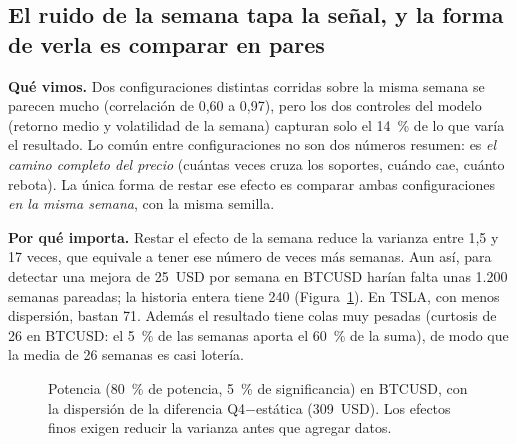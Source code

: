 \documentclass[11pt,a4paper]{article}
\begin{document}
\subsection{El ruido de la semana tapa la señal, y la forma de verla es comparar en pares}
\textbf{Qué vimos.} Dos configuraciones distintas corridas sobre la misma semana se parecen mucho (correlación
de 0,60 a 0,97), pero los dos controles del modelo (retorno medio y volatilidad de la semana) capturan solo
el 14~\% de lo que varía el resultado. Lo común entre configuraciones no son dos números resumen: es \emph{el camino
completo del precio} (cuántas veces cruza los soportes, cuándo cae, cuánto rebota). La única forma de restar
ese efecto es comparar ambas configuraciones \emph{en la misma semana}, con la misma semilla.

\textbf{Por qué importa.} Restar el efecto de la semana reduce la varianza entre 1,5 y 17 veces, que equivale a
tener ese número de veces más semanas. Aun así, para detectar una mejora de 25~USD por semana en BTCUSD harían
falta unas 1.200 semanas pareadas; la historia entera tiene 240 (Figura~\ref{fig:potencia}). En TSLA, con menos
dispersión, bastan 71. Además el resultado tiene colas muy pesadas (curtosis de 26 en BTCUSD: el 5~\% de las
semanas aporta el 60~\% de la suma), de modo que la media de 26 semanas es casi lotería.

\begin{figure}[H]
\centering
{}
\caption{Potencia (80~\% de potencia, 5~\% de significancia) en BTCUSD, con la dispersión de la diferencia
Q4$-$estática (309~USD). Los efectos finos exigen reducir la varianza antes que agregar datos.}
\label{fig:potencia}
\end{figure}
\end{document}

